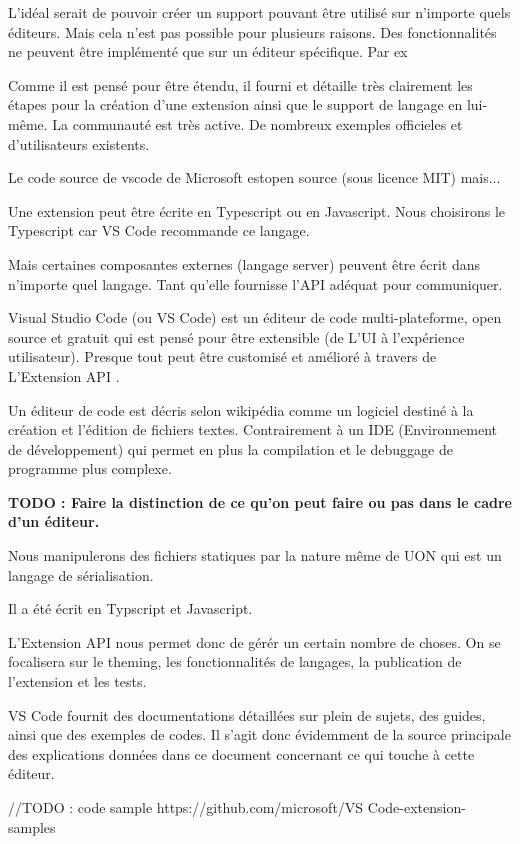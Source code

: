 \documentclass[
    iict, %
    il, %
]{heig-tb}
\begin{document}
L'idéal serait de pouvoir créer un support pouvant être utilisé sur n'importe quels éditeurs. Mais cela n'est pas possible pour plusieurs raisons.
Des fonctionnalités ne peuvent être implémenté que sur un éditeur spécifique. Par ex


Comme il est pensé pour être étendu, il fourni et détaille très clairement les étapes pour la création d'une extension ainsi que le support de langage en lui-même.
La communauté est très active.
De nombreux exemples officieles et d'utilisateurs existents.

Le code source de vscode de Microsoft estopen source (sous licence MIT) mais...

Une extension peut être écrite en Typescript ou en Javascript.
Nous choisirons le Typescript car VS Code recommande ce langage.

Mais certaines composantes externes (langage server) peuvent être écrit dans n'importe quel langage. Tant qu'elle fournisse l'API adéquat pour communiquer.


Visual Studio Code (ou VS Code) est un éditeur de code multi-plateforme, open source et gratuit qui est pensé pour être extensible (de L'UI à l'expérience utilisateur).
Presque tout peut être customisé et amélioré à travers de L'Extension API \cite{extension-api}.


Un éditeur de code est décris selon wikipédia comme un logiciel destiné à la création et l'édition de fichiers textes.
Contrairement à un IDE (Environnement de développement) qui permet en plus la compilation et le debuggage de programme plus complexe.

\textbf{TODO : Faire la distinction de ce qu'on peut faire ou pas dans le cadre d'un éditeur.}

Nous manipulerons des fichiers statiques par la nature même de UON qui est un langage de sérialisation.


Il a été écrit en Typscript et Javascript.

L'Extension API nous permet donc de gérér un certain nombre de choses.
On se focalisera sur le theming, les fonctionnalités de langages, la publication de l'extension et les tests.

VS Code fournit des documentations détaillées sur plein de sujets, des guides, ainsi que des exemples de codes.
Il s'agit donc évidemment de la source principale des explications données dans ce document concernant ce qui touche à cette éditeur.

//TODO : code sample https://github.com/microsoft/VS Code-extension-samples
\end{document}
